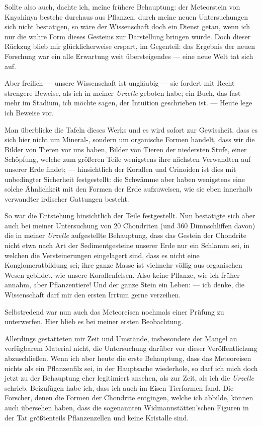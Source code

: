 \documentclass[a4paper, 12pt, oneside]{article}
\begin{document}
Sollte also auch, dachte ich, meine frühere Behauptung: der Meteorstein von Knyahinya bestehe durchaus aus Pflanzen, durch meine neuen Untersuchungen sich nicht bestätigen, so wäre der Wissenschaft doch ein Dienst getan, wenn ich nur die wahre Form dieses Gesteins zur Darstellung bringen würde. Doch dieser Rückzug blieb mir glücklicherweise erspart, im Gegenteil: das Ergebnis der neuen Forschung war ein alle Erwartung weit übersteigendes — eine neue Welt tat sich auf.

Aber freilich — unsere Wissenschaft ist ungläubig — sie fordert mit Recht strengere Beweise, als ich in meiner \emph{Urzelle} geboten habe; ein Buch, das fast mehr im Stadium, ich möchte sagen, der Intuition geschrieben ist. — Heute lege ich Beweise vor.

Man überblicke die Tafeln dieses Werks und es wird sofort zur Gewissheit, dass es sich hier nicht um Mineral-, sondern um organische Formen handelt, dass wir die Bilder von Tieren vor uns haben, Bilder von Tieren der niedersten Stufe, einer Schöpfung, welche zum größeren Teile wenigstens ihre nächsten Verwandten auf unserer Erde findet; — hinsichtlich der Korallen und Crinoiden ist dies mit unbedingter Sicherheit festgestellt: die Schwämme aber haben wenigstens eine solche Ähnlichkeit mit den Formen der Erde aufzuweisen, wie sie eben innerhalb verwandter irdischer Gattungen besteht.

So war die Entstehung hinsichtlich der Teile festgestellt. Nun bestätigte sich aber auch bei meiner Untersuchung von 20 Chondriten (und 360 Dünnschliffen davon) die in meiner \emph{Urzelle} aufgestellte Behauptung, dass das Gestein der Chondrite nicht etwa nach Art der Sedimentgesteine unserer Erde nur ein Schlamm sei, in welchen die Versteinerungen eingelagert sind, dass es nicht eine Konglomeratbildung sei; ihre ganze Masse ist vielmehr völlig aus organischen Wesen gebildet, wie unsere Korallenfelsen. Also keine Pflanze, wie ich früher annahm, aber Pflanzentiere! Und der ganze Stein ein Leben: — ich denke, die Wissenschaft darf mir den ersten Irrtum gerne verzeihen.

Selbstredend war nun auch das Meteoreisen nochmals einer Prüfung zu unterwerfen. Hier blieb es bei meiner ersten Beobachtung.

Allerdings gestatteten mir Zeit und Umstände, insbesondere der Mangel an verfügbarem Material nicht, die Untersuchung darüber vor dieser Veröffentlichung abzuschließen. Wenn ich aber heute die erste Behauptung, dass das Meteoreisen nichts als ein Pflanzenfilz sei, in der Hauptsache wiederhole, so darf ich mich doch jetzt zu der Behauptung eher legitimiert ansehen, als zur Zeit, als ich die \emph{Urzelle} schrieb. Beizufügen habe ich, dass ich auch im Eisen Tierformen fand. Die Forscher, denen die Formen der Chondrite entgingen, welche ich abbilde, können auch übersehen haben, dass die sogenannten Widmannstätten'schen Figuren in der Tat größtenteils Pflanzenzellen und keine Kristalle sind.
\end{document}
